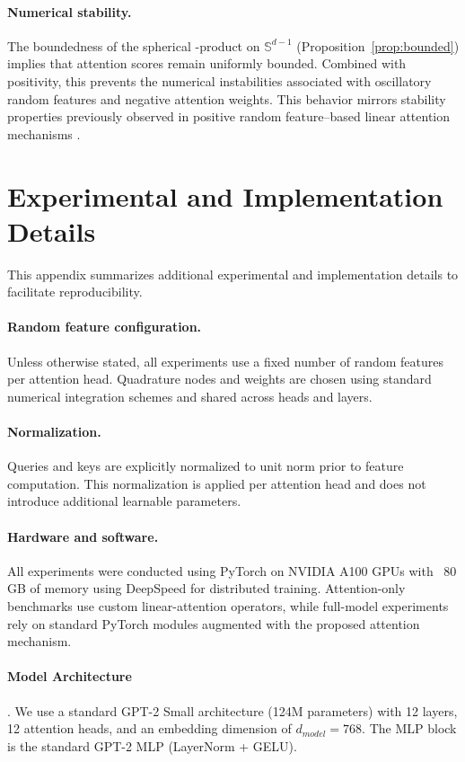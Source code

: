 \documentclass{article}
\DeclareRobustCommand{\E}{\text{\normalfont\tifinaghfont ⵟ}}
\newcommand{\Sph}{\mathbb{S}}
\begin{document}
\paragraph{Numerical stability.}
The boundedness of the spherical \E-product on $\Sph^{d-1}$
(Proposition~\ref{prop:bounded}) implies that attention scores remain uniformly bounded.
Combined with positivity, this prevents the numerical instabilities associated with oscillatory random features and negative attention weights.
This behavior mirrors stability properties previously observed in positive random
feature–based linear attention mechanisms \citep{performers}.

\section{Experimental and Implementation Details}
\label{app:experiments}

This appendix summarizes additional experimental and implementation details to facilitate reproducibility.

\paragraph{Random feature configuration.}
Unless otherwise stated, all experiments use a fixed number of random features per attention head. Quadrature nodes and weights are chosen using standard numerical integration schemes and shared across heads and layers.

\paragraph{Normalization.}
Queries and keys are explicitly normalized to unit norm prior to feature computation. This normalization is applied per attention head and does not introduce additional learnable parameters.

\paragraph{Hardware and software.}
All experiments were conducted using PyTorch on NVIDIA A100 GPUs with ~80\,GB of memory using DeepSpeed for distributed training. Attention-only benchmarks use custom linear-attention operators, while full-model experiments rely on standard PyTorch modules augmented with the proposed attention mechanism.

\paragraph{Model Architecture}. We use a standard GPT-2 Small architecture (124M parameters) with 12 layers, 12 attention heads, and an embedding dimension of $d_{model}=768$. The MLP block is the standard GPT-2 MLP (LayerNorm + GELU).
\end{document}
